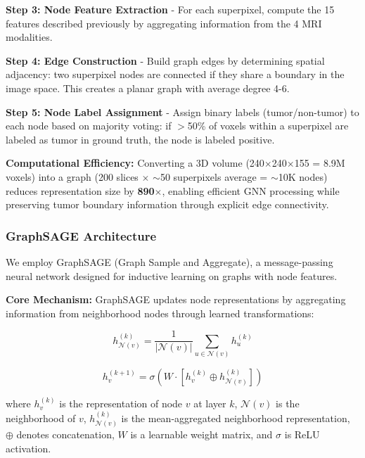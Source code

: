 \textbf{Step 3: Node Feature Extraction} - For each superpixel, compute the 15 features described previously by aggregating information from the 4 MRI modalities.

\textbf{Step 4: Edge Construction} - Build graph edges by determining spatial adjacency: two superpixel nodes are connected if they share a boundary in the image space. This creates a planar graph with average degree 4-6.

\textbf{Step 5: Node Label Assignment} - Assign binary labels (tumor/non-tumor) to each node based on majority voting: if $>$50\% of voxels within a superpixel are labeled as tumor in ground truth, the node is labeled positive.

\textbf{Computational Efficiency:} Converting a 3D volume (240$\times$240$\times$155 = 8.9M voxels) into a graph (200 slices $\times$ $\sim$50 superpixels average = $\sim$10K nodes) reduces representation size by \textbf{890$\times$}, enabling efficient GNN processing while preserving tumor boundary information through explicit edge connectivity.

\subsubsection{GraphSAGE Architecture}

We employ GraphSAGE (Graph Sample and Aggregate), a message-passing neural network designed for inductive learning on graphs with node features.

\textbf{Core Mechanism:} GraphSAGE updates node representations by aggregating information from neighborhood nodes through learned transformations:

\begin{equation}
h_{\mathcal{N}(v)}^{(k)} = \frac{1}{|\mathcal{N}(v)|} \sum_{u \in \mathcal{N}(v)} h_u^{(k)}
\end{equation}

\begin{equation}
h_v^{(k+1)} = \sigma \left( W \cdot \left[ h_v^{(k)} \oplus h_{\mathcal{N}(v)}^{(k)} \right] \right)
\end{equation}

where $h_v^{(k)}$ is the representation of node $v$ at layer $k$, $\mathcal{N}(v)$ is the neighborhood of $v$, $h_{\mathcal{N}(v)}^{(k)}$ is the mean-aggregated neighborhood representation, $\oplus$ denotes concatenation, $W$ is a learnable weight matrix, and $\sigma$ is ReLU activation.

